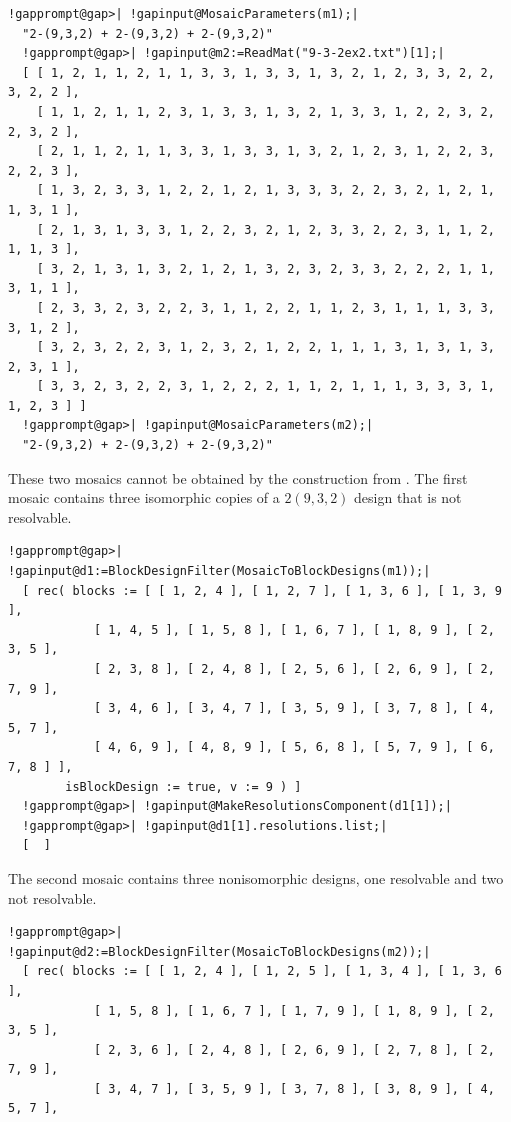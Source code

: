\documentclass[a4paper,11pt]{report}
\begin{document}
{{\begin{Verbatim}[commandchars=!@|,fontsize=\small,frame=single,label=Example]
  !gapprompt@gap>| !gapinput@MosaicParameters(m1);|
  "2-(9,3,2) + 2-(9,3,2) + 2-(9,3,2)"
  !gapprompt@gap>| !gapinput@m2:=ReadMat("9-3-2ex2.txt")[1];|
  [ [ 1, 2, 1, 1, 2, 1, 1, 3, 3, 1, 3, 3, 1, 3, 2, 1, 2, 3, 3, 2, 2, 3, 2, 2 ], 
    [ 1, 1, 2, 1, 1, 2, 3, 1, 3, 3, 1, 3, 2, 1, 3, 3, 1, 2, 2, 3, 2, 2, 3, 2 ], 
    [ 2, 1, 1, 2, 1, 1, 3, 3, 1, 3, 3, 1, 3, 2, 1, 2, 3, 1, 2, 2, 3, 2, 2, 3 ], 
    [ 1, 3, 2, 3, 3, 1, 2, 2, 1, 2, 1, 3, 3, 3, 2, 2, 3, 2, 1, 2, 1, 1, 3, 1 ], 
    [ 2, 1, 3, 1, 3, 3, 1, 2, 2, 3, 2, 1, 2, 3, 3, 2, 2, 3, 1, 1, 2, 1, 1, 3 ], 
    [ 3, 2, 1, 3, 1, 3, 2, 1, 2, 1, 3, 2, 3, 2, 3, 3, 2, 2, 2, 1, 1, 3, 1, 1 ], 
    [ 2, 3, 3, 2, 3, 2, 2, 3, 1, 1, 2, 2, 1, 1, 2, 3, 1, 1, 1, 3, 3, 3, 1, 2 ], 
    [ 3, 2, 3, 2, 2, 3, 1, 2, 3, 2, 1, 2, 2, 1, 1, 1, 3, 1, 3, 1, 3, 2, 3, 1 ], 
    [ 3, 3, 2, 3, 2, 2, 3, 1, 2, 2, 2, 1, 1, 2, 1, 1, 1, 3, 3, 3, 1, 1, 2, 3 ] ]
  !gapprompt@gap>| !gapinput@MosaicParameters(m2);|
  "2-(9,3,2) + 2-(9,3,2) + 2-(9,3,2)"
\end{Verbatim}
 These two mosaics cannot be obtained by the construction from \cite{GGP18}. The first mosaic contains three isomorphic copies of a $2$\texttt{}$(9,3,2)$ design that is not resolvable. 
\begin{Verbatim}[commandchars=!@|,fontsize=\small,frame=single,label=Example]
  !gapprompt@gap>| !gapinput@d1:=BlockDesignFilter(MosaicToBlockDesigns(m1));|
  [ rec( blocks := [ [ 1, 2, 4 ], [ 1, 2, 7 ], [ 1, 3, 6 ], [ 1, 3, 9 ], 
            [ 1, 4, 5 ], [ 1, 5, 8 ], [ 1, 6, 7 ], [ 1, 8, 9 ], [ 2, 3, 5 ], 
            [ 2, 3, 8 ], [ 2, 4, 8 ], [ 2, 5, 6 ], [ 2, 6, 9 ], [ 2, 7, 9 ], 
            [ 3, 4, 6 ], [ 3, 4, 7 ], [ 3, 5, 9 ], [ 3, 7, 8 ], [ 4, 5, 7 ], 
            [ 4, 6, 9 ], [ 4, 8, 9 ], [ 5, 6, 8 ], [ 5, 7, 9 ], [ 6, 7, 8 ] ], 
        isBlockDesign := true, v := 9 ) ]
  !gapprompt@gap>| !gapinput@MakeResolutionsComponent(d1[1]);|
  !gapprompt@gap>| !gapinput@d1[1].resolutions.list;|
  [  ]
\end{Verbatim}
 The second mosaic contains three non\texttt{}isomorphic designs,
one resolvable and two not resolvable. 
\begin{Verbatim}[commandchars=!@|,fontsize=\small,frame=single,label=Example]
  !gapprompt@gap>| !gapinput@d2:=BlockDesignFilter(MosaicToBlockDesigns(m2));|
  [ rec( blocks := [ [ 1, 2, 4 ], [ 1, 2, 5 ], [ 1, 3, 4 ], [ 1, 3, 6 ], 
            [ 1, 5, 8 ], [ 1, 6, 7 ], [ 1, 7, 9 ], [ 1, 8, 9 ], [ 2, 3, 5 ], 
            [ 2, 3, 6 ], [ 2, 4, 8 ], [ 2, 6, 9 ], [ 2, 7, 8 ], [ 2, 7, 9 ], 
            [ 3, 4, 7 ], [ 3, 5, 9 ], [ 3, 7, 8 ], [ 3, 8, 9 ], [ 4, 5, 7 ], 

\end{Verbatim}}}
\end{document}

